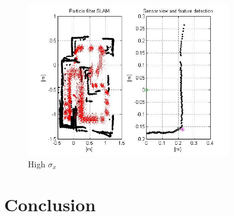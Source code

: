 \documentclass[12pt]{article}
\begin{document}
\begin{figure}[H]
	\centering
	\includegraphics[width=0.8\textwidth]{own_very_high_sigma.jpg}
	\caption{High $\sigma_x$}
\end{figure}

\section{Conclusion}
\end{document}
